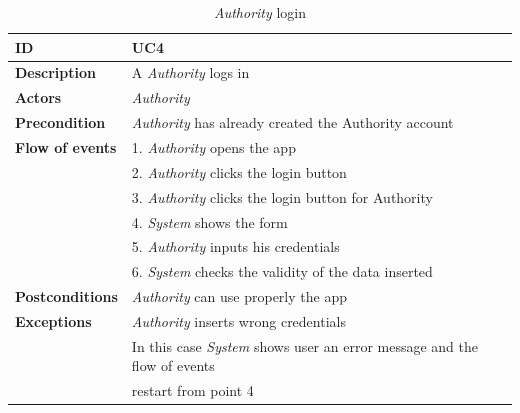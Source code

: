 \documentclass{article}
\begin{document}
\clearpage
\begin{table}
    \begin{center}
    \centering
\begin{tabular}{ | l | l |}
\hline
\textbf{ID} & UC4 \\
\hline
\textbf{Description} & A \textit{Authority} logs in  \\
\hline
\textbf{Actors} & \textit{Authority} \\
\hline
\textbf{Precondition} & \textit{Authority} has already created the Authority account \\
\hline
\textbf{Flow of events} & 1. \textit{Authority} opens the app \\
                        & 2. \textit{Authority} clicks the login button  \\
                        & 3. \textit{Authority} clicks the login button for Authority \\
                        & 4. \textit{System} shows the form \\
                        & 5. \textit{Authority} inputs his credentials  \\
                        & 6. \textit{System} checks the validity of the data inserted \\
\hline
\textbf{Postconditions} & \textit{Authority} can use properly the app   \\
\hline
\textbf{Exceptions} & \textit{Authority} inserts wrong credentials \\
                    & In this case \textit{System} shows user an error message and the flow of events  \\
                    & restart from point 4\\  
\hline
\end{tabular}
\caption{\textit{Authority} login}
\end{center}
\end{table}
\end{document}
